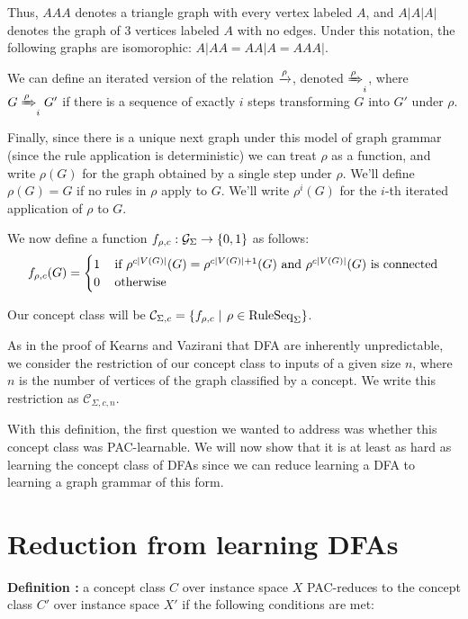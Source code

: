 \documentclass[]{article}
\def\RuleSeq{\mathrm{RuleSeq}\xspace}
\def\Graphs{\mathcal{G}\xspace}
\def\Concepts{\mathcal{C}\xspace}
\begin{document}
Thus, $AAA$ denotes a triangle graph with every vertex labeled $A$, and $A|A|A|$
denotes the graph of 3 vertices labeled $A$ with no edges. Under this notation,
the following graphs are isomorophic: $A|AA = AA|A = AAA|$.

We can define an iterated version of the relation $\xrightarrow{\rho}$, denoted
$\xRightarrow{\rho}_i$, where $G \xRightarrow{\rho}_i G'$ if there is a sequence of exactly
$i$ steps transforming $G$ into $G'$ under $\rho$.

Finally, since there is a unique next graph under this model of graph grammar
(since the rule application is deterministic) we can treat $\rho$ as a function,
and write $\rho(G)$ for the graph obtained by a single step under $\rho$. We'll
define $\rho(G) =G$ if no rules in $\rho$ apply to $G$. We'll write $\rho^i(G)$
for the $i$-th iterated application of $\rho$ to $G$.

We now define a function $f_{\rho,c} : \Graphs_{\Sigma} \to \Set{0,1}$ as follows:
\[f_{\rho,c}(G) = \begin{cases}
    1 &\,\text{if $\rho^{c\left| V(G) \right|}(G) = \rho^{c\left| V(G) \right|+1}(G)$ and $\rho^{c\left| V(G) \right|}(G)$ is connected}\\
    0 &\,\text{otherwise}
  \end{cases}\]

Our concept class will be
\(\Concepts_{\Sigma,c} = \Setbar{f_{\rho,c}}{\rho\in \RuleSeq_\Sigma}\).

As in the proof of Kearns and Vazirani that DFA are inherently unpredictable, we
consider the restriction of our concept class to inputs of a given size $n$,
where $n$ is the number of vertices of the graph classified by a concept. We
write this restriction as $\Concepts_{\Sigma,c,n}$.

With this definition, the first question we wanted to address was whether this
concept class was PAC-learnable. We will now show that it is at least as
hard as learning the concept class of DFAs since we can reduce learning a DFA to
learning a graph grammar of this form.

\section{Reduction from learning DFAs}

\textbf{Definition \cite{kearns1994}:} a concept class \(C\) over
instance space \(X\) PAC-reduces to the concept class \(C'\) over
instance space \(X'\) if the following conditions are met:
\end{document}
